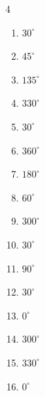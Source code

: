 \begin{multicols}{4}
\begin{enumerate}
  \item $\displaystyle 30^{\circ}$

  \item $\displaystyle 45^{\circ}$

  \item $\displaystyle 135^{\circ}$

  \item $\displaystyle 330^{\circ}$

  \item $\displaystyle 30^{\circ}$

  \item $\displaystyle 360^{\circ}$
        \phantom{$\displaystyle =2\pi$}

  \item $\displaystyle 180^{\circ}$
        \phantom{$\displaystyle =\pi$}

  \item $\displaystyle 60^{\circ}$

  \item $\displaystyle 300^{\circ}$

  \item $\displaystyle 30^{\circ}$

  \item $\displaystyle 90^{\circ}$

  \item $\displaystyle 30^{\circ}$

  \item $\displaystyle 0^{\circ}$
        \phantom{$\displaystyle =0$}

  \item $\displaystyle 300^{\circ}$

  \item $\displaystyle 330^{\circ}$

  \item $\displaystyle 0^{\circ}$
        \phantom{$\displaystyle =0$}


\end{enumerate}
\end{multicols}
